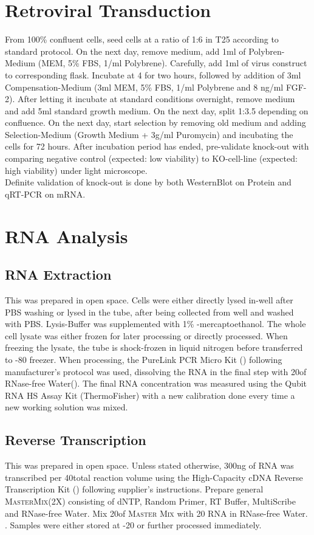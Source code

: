 \section{Retroviral Transduction}
From 100\% confluent cells, seed cells at a ratio of 1:6 in T25 according to standard protocol. On the next day, remove medium, add 1ml of Polybren-Medium (MEM\textalpha{}, 5\% FBS, 1\mul{}/ml Polybrene). Carefully, add 1ml of virus construct to corresponding flask. Incubate at 4 \degC for two hours, followed by addition of 3ml Compensation-Medium (3ml MEM\textalpha{}, 5\% FBS, 1\mul{}/ml Polybrene and 8 ng/ml FGF-2). After letting it incubate at standard conditions overnight, remove medium and add 5ml standard growth medium. On the next day, split 1:3.5 depending on confluence. On the next day, start selection by removing old medium and adding Selection-Medium (Growth Medium + 3\textmu{}g/ml Puromycin) and incubating the cells for 72 hours. After incubation period has ended, pre-validate knock-out with comparing negative control (expected: low viability) to KO-cell-line (expected: high viability) under light microscope.\\
Definite validation of knock-out is done by both WesternBlot on Protein and qRT-PCR on mRNA. 

\section{RNA Analysis}
\subsection{RNA Extraction}
This was prepared in open space. Cells were either directly lysed in-well after PBS washing or lysed in the tube, after being collected from well and washed with PBS. Lysis-Buffer was supplemented with 1\% \textbeta-mercaptoethanol. The whole cell lysate was either frozen for later processing or directly processed. When freezing the lysate, the tube is shock-frozen in liquid nitrogen before transferred to -80 \degC freezer. When processing, the PureLink PCR Micro Kit () following manufacturer's protocol was used, dissolving the RNA in the final step with 20\mul of RNase-free Water(). The final RNA concentration was measured using the Qubit RNA HS Assay Kit (ThermoFisher) with a new calibration done every time a new working solution was mixed.

\subsection{Reverse Transcription}
This was prepared in open space. Unless stated otherwise, 300ng of RNA was transcribed per 40\mul total reaction volume using the High-Capacity cDNA Reverse Transcription Kit () following supplier's instructions. Prepare general \textsc{MasterMix}(2X) consisting of dNTP, Random Primer, RT Buffer, MultiScribe and RNase-free Water. Mix 20\mul of \textsc{Master Mix} with 20\mul{} RNA in RNase-free Water. . Samples were either stored at -20 \degC or further processed immediately. 

